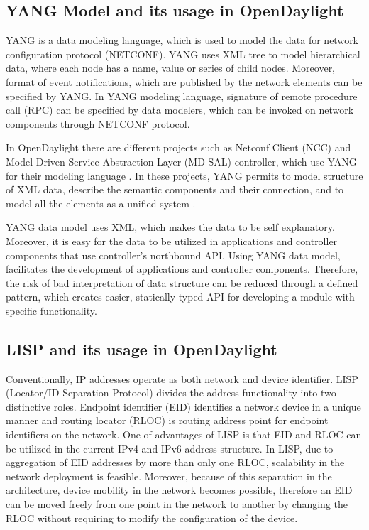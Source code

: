 \documentclass[english]{tktltiki2}
\theoremstyle{definition}
\theoremstyle{remark}
\begin{document}
{\subsection{YANG Model and its usage in OpenDaylight}

YANG is a data modeling language, which is used to model the data for network configuration protocol (NETCONF). YANG uses XML tree to model hierarchical data, where each node has a name, value or series of child nodes. Moreover, format of event notifications, which are published by the network elements can be specified by YANG. In YANG modeling language, signature of remote procedure call (RPC) can be specified by data modelers, which can be invoked on network components through NETCONF protocol. \cite{Bjo10}

In OpenDaylight there are different projects such as Netconf Client (NCC) and Model Driven Service Abstraction Layer (MD-SAL) controller, which use YANG for their modeling language \cite{MDS} \cite{Netconf}. In these projects, YANG permits to model structure of XML data, describe the semantic components and their connection, and to model all the elements as a unified system \cite{MDS}.

YANG data model uses XML, which makes the data to be self explanatory. Moreover, it is easy for the data to be utilized in applications and controller components that use controller’s northbound API. Using YANG data model, facilitates the development of applications and controller components. Therefore, the risk of bad interpretation of data structure can be reduced through a defined pattern, which creates easier, statically typed API for developing a module with specific functionality. \cite{MDS}

\subsection{LISP and its usage in OpenDaylight}

Conventionally, IP addresses operate as both network and device identifier. LISP (Locator/ID Separation Protocol) divides the address functionality into two distinctive roles. Endpoint identifier (EID)  identifies a network device in a unique manner and routing locator (RLOC) is routing address point for endpoint identifiers on the network. One of advantages of LISP is that EID and RLOC can be utilized in the current IPv4 and IPv6 address structure. In LISP, due to aggregation of EID addresses by more than only one RLOC, scalability in the network deployment is feasible. Moreover, because of this separation in the architecture, device mobility in the network becomes possible, therefore an EID can be moved freely from one point in the network to another by changing the RLOC without requiring to modify the configuration of the device. \cite{OKH14}

}
\end{document}
